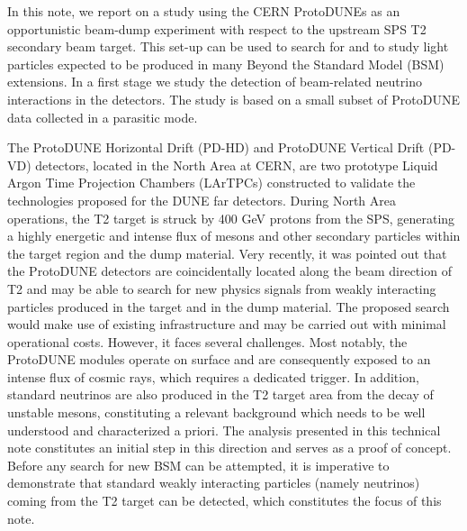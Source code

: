 In this note, we report on a study using the CERN ProtoDUNEs as an opportunistic beam-dump experiment with respect to the upstream SPS T2 secondary beam target. This set-up can be used to search for and to study light particles expected to be produced in many Beyond the Standard Model (BSM) extensions. In a first stage we study the detection of beam-related neutrino interactions in the detectors. The study is based on a small subset of ProtoDUNE data collected in a parasitic mode. 

The ProtoDUNE Horizontal Drift (PD-HD) and ProtoDUNE Vertical Drift (PD-VD) detectors, located in the North Area at CERN, are two prototype Liquid Argon Time Projection Chambers (LArTPCs) constructed to validate the technologies proposed for the DUNE far detectors. During North Area operations, the T2 target is struck by 400 GeV protons from the SPS, generating a highly energetic and intense flux of mesons and other secondary particles within the target region and the dump material. Very recently, it was pointed out \cite{coloma2024new} that the ProtoDUNE detectors are coincidentally located along the beam direction of T2 and may be able to search for new physics signals from weakly interacting particles produced in the target and in the dump material. The proposed search would make use of existing infrastructure and may be carried out with minimal operational costs. However, it faces several challenges. Most notably, the ProtoDUNE modules operate on surface and are consequently exposed to an intense flux of cosmic rays, which requires a dedicated trigger. In addition, standard neutrinos are also produced in the T2 target area from the decay of unstable mesons, constituting a relevant background which needs to be well understood and characterized a priori. The analysis presented in this technical note constitutes an initial step in this direction and serves as a proof of concept. Before any search for new BSM can be attempted, it is imperative to demonstrate that standard weakly interacting
particles (namely neutrinos) coming from the T2 target can be detected, which constitutes the focus of this note.

